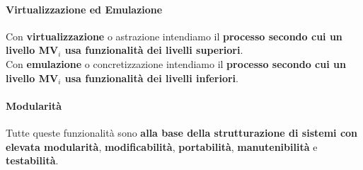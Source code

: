 \documentclass[10pt]{report}
\begin{document}
\paragraph{Virtualizzazione ed Emulazione} Con \textbf{virtualizzazione} o astrazione intendiamo il \textbf{processo secondo cui un livello MV$_{i}$ usa funzionalità dei livelli superiori}.\\
Con \textbf{emulazione} o concretizzazione intendiamo il \textbf{processo secondo cui un livello MV$_{i}$ usa funzionalità dei livelli inferiori}.
\paragraph{Modularità} Tutte queste funzionalità sono \textbf{alla base della strutturazione di sistemi con elevata modularità}, \textbf{modificabilità}, \textbf{portabilità}, \textbf{manutenibilità} e \textbf{testabilità}.
\end{document}
